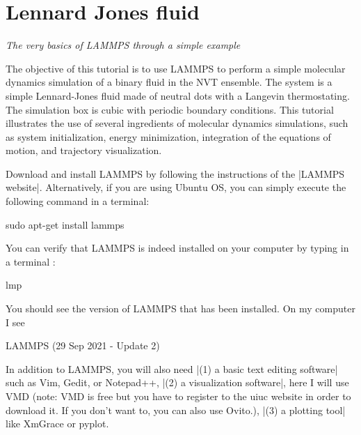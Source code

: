 \chapter{Lennard Jones fluid}






\vspace{-1cm} \noindent \textcolor{graytitle}{\textit{{\Large The very basics of LAMMPS through a simple example}}\vspace{0.5cm} }






The objective of this tutorial is to use
LAMMPS to perform a simple molecular dynamics simulation
of a binary fluid in the NVT ensemble. The system is a simple Lennard-Jones fluid
made of neutral dots with a Langevin thermostating. The
simulation box is cubic with periodic boundary conditions.
This tutorial illustrates the use of several ingredients of
molecular dynamics simulations, such as system initialization,
energy minimization, integration of the equations of motion,
and trajectory visualization.








Download and install LAMMPS by following the instructions of the |LAMMPS website|.
Alternatively, if you are using Ubuntu OS, you can simply execute the
following command in a terminal:



\begin{lcverbatim}
sudo apt-get install lammps
\end{lcverbatim}

You can verify that LAMMPS is indeed installed on your
computer by typing in a terminal :



\begin{lcverbatim}
lmp
\end{lcverbatim}

You should see the version of LAMMPS that has been
installed. On my computer I see



\begin{lcverbatim}
LAMMPS (29 Sep 2021 - Update 2)
\end{lcverbatim}

In addition to LAMMPS, you will also need |(1) a basic text editing software|
such as Vim, Gedit, or Notepad++, |(2) a visualization software|, here I
will use VMD (note: VMD is free but you have to register to
the uiuc website in order to download it. If you don't want
to, you can also use Ovito.), |(3) a plotting tool| like
XmGrace or pyplot.














